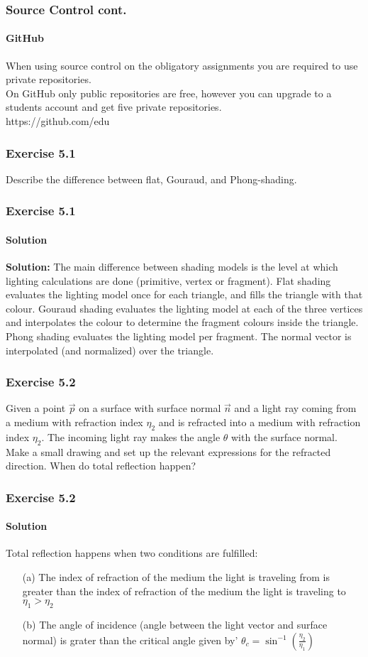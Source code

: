 \documentclass[11pt]{beamer}
\begin{document}
	\begin{frame}
		\frametitle{Source Control cont.}
		\framesubtitle{GitHub}
		When using source control on the obligatory assignments you are required to use private repositories. \\ 
		On GitHub only public repositories are free, however you can upgrade to a students account and get five private repositories.\\
		https://github.com/edu
		
	\end{frame}	  	
  	
  	\begin{frame}
    		\frametitle{Exercise 5.1}
		\begin{center}
    		Describe the difference between flat, Gouraud, and Phong-shading.
		\end{center}		    		
  	\end{frame}

	\begin{frame}
    		\frametitle{Exercise 5.1}
    		\framesubtitle{Solution}
		\textbf{Solution:}	
		The main difference between shading models is the level at which lighting
calculations are done (primitive, vertex or fragment).
Flat shading evaluates the lighting model once for each triangle, and fills the triangle with
that colour.
Gouraud shading evaluates the lighting model at each of the three vertices and interpolates
the colour to determine the fragment colours inside the triangle.
Phong shading evaluates the lighting model per fragment. The normal vector is interpolated
(and normalized) over the triangle.		    		
		    
  	\end{frame}
  	
  	\begin{frame}
  		\frametitle{Exercise 5.2}
    		Given a point $\vec{p}$ on a surface with surface normal $\vec{n}$ and a light ray coming from a medium with refraction index $\eta _2$ and is refracted into a medium with refraction index $\eta _2$. The
incoming light ray makes the angle $\theta$ with the surface normal.
Make a small drawing and set up the relevant expressions for the refracted direction.
When do total reflection happen?
  	\end{frame}
	
	\begin{frame}
		\frametitle{Exercise 5.2}
		\framesubtitle{Solution}
		
		Total reflection happens when two conditions are fulfilled:
		
		\begin{enumerate}
\item[(a)] The index of refraction of the medium the light is traveling from is greater than the
index of refraction of the medium the light is traveling to
$\eta_1 > \eta_2$
\item[(b)] The angle of incidence (angle between the light vector and surface normal) is grater
than the critical angle given by'
$\theta_c = \sin^{-1} \left(\frac{\eta_2}{\eta_1}\right)$
\end{enumerate}
	\end{frame}		
\end{document}
